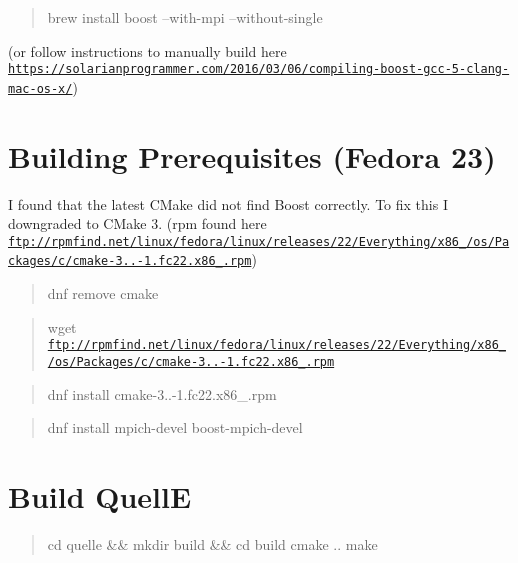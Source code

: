 \begin{quote}
brew install boost --with-\/mpi --without-\/single \end{quote}
(or follow instructions to manually build here \href{https://solarianprogrammer.com/2016/03/06/compiling-boost-gcc-5-clang-mac-os-x/}{\tt https\+://solarianprogrammer.\+com/2016/03/06/compiling-\/boost-\/gcc-\/5-\/clang-\/mac-\/os-\/x/})

\section*{Building Prerequisites (Fedora 23)}

I found that the latest C\+Make did not find Boost correctly. To fix this I downgraded to C\+Make 3. (rpm found here \href{ftp://rpmfind.net/linux/fedora/linux/releases/22/Everything/x86_64/os/Packages/c/cmake-3.2.2-1.fc22.x86_64.rpm}{\tt ftp\+://rpmfind.\+net/linux/fedora/linux/releases/22/\+Everything/x86\+\_/os/\+Packages/c/cmake-\/3..-\/1.\+fc22.\+x86\+\_.\+rpm})

\begin{quote}
dnf remove cmake \end{quote}


\begin{quote}
wget \href{ftp://rpmfind.net/linux/fedora/linux/releases/22/Everything/x86_64/os/Packages/c/cmake-3.2.2-1.fc22.x86_64.rpm}{\tt ftp\+://rpmfind.\+net/linux/fedora/linux/releases/22/\+Everything/x86\+\_/os/\+Packages/c/cmake-\/3..-\/1.\+fc22.\+x86\+\_.\+rpm} \end{quote}


\begin{quote}
dnf install cmake-\/3..-\/1.\+fc22.\+x86\+\_.\+rpm \end{quote}


\begin{quote}
dnf install mpich-\/devel boost-\/mpich-\/devel \end{quote}


\section*{Build QuellE}

\begin{quote}
cd quelle \&\& mkdir build \&\& cd build cmake .. make \end{quote}

